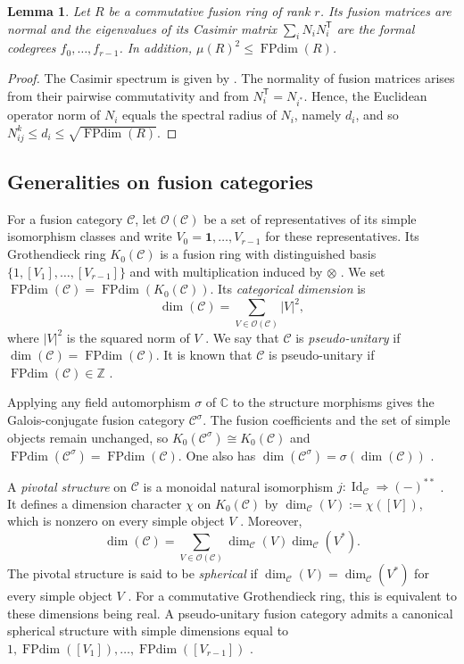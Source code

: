 \documentclass[11pt]{amsart}
\newtheorem{lemma}[theorem]{Lemma}
\theoremstyle{definition}
\DeclareMathOperator{\FPdim}{FPdim}
\newcommand{\C}{\mathbb C}
\newcommand{\Z}{\mathbb Z}
\newcommand{\one}{\mathbf1}
\numberwithin{equation}{section}
\begin{document}
\begin{lemma}\label{lem:commutative}
Let $R$ be a commutative fusion ring of rank $r$. Its fusion matrices are
normal and the eigenvalues of its \textnormal{Casimir matrix} $\sum_iN_iN_i^{\mathsf T}$ are the formal codegrees $f_0,\dots, f_{r-1}$.
In addition, $\mu(R)^2\leq\FPdim(R)$.
\end{lemma}
\begin{proof}
The Casimir spectrum is given by
\cite[Example~2.4 and Lemma~2.6]{OstrikCodegrees}.
The normality of fusion matrices arises from their pairwise commutativity and from $N_i^{\mathsf T}=N_{i^*}$. 
Hence, the Euclidean operator norm of $N_i$ equals the spectral radius of $N_i$, namely $d_i$, and so $N_{ij}^k\leq d_i\leq\sqrt{\FPdim(R)}$.
\end{proof}

\subsection{Generalities on fusion categories} \label{sub-sec2.2}
For a fusion category $\mathcal C$, let $\mathcal O(\mathcal C)$ be a
set of representatives of its simple isomorphism classes and write
$V_0=\one,\ldots,V_{r-1}$ for these representatives.
Its Grothendieck ring $K_0(\mathcal C)$ is a fusion ring with distinguished basis
$\{1, [V_1],\dots, [V_{r-1}]\}$ and with multiplication induced by $\otimes$
\cite[Proposition~4.9.1]{EGNO}. We set
$\FPdim(\mathcal C)=\FPdim(K_0(\mathcal C))$.
Its \textit{categorical dimension} is
\[
 \dim(\mathcal C)=\sum_{V\in\mathcal O(\mathcal C)}|V|^2,
\]
where $|V|^2$ is the squared norm of $V$ \cite[Definition~7.21.3]{EGNO}.
We say that $\mathcal{C}$ is \emph{pseudo-unitary} if
$\dim(\mathcal C)=\FPdim(\mathcal C)$.
It is known that $\mathcal{C}$ is pseudo-unitary if $\FPdim(\mathcal C)\in\Z$ \cite[Proposition~9.6.5]{EGNO}.

Applying any field automorphism $\sigma$ of $\C$ to the
structure morphisms gives the Galois-conjugate fusion category
$\mathcal C^\sigma$. The fusion coefficients and the set of simple objects remain
unchanged, so $K_0(\mathcal C^\sigma)\cong K_0(\mathcal C)$ and
$\FPdim(\mathcal C^\sigma)=\FPdim(\mathcal C)$.
One also has $\dim(\mathcal C^\sigma)=\sigma(\dim(\mathcal C))$
\cite[\S2.1]{OstrikGlobal}.

A \textit{pivotal structure} on $\mathcal C$ is a monoidal natural isomorphism
$j:\operatorname{Id}_{\mathcal C}\Rightarrow(-)^{**}$
\cite[Definition~4.7.7]{EGNO}. It defines a dimension character $\chi$ on $K_0(\mathcal{C})$ by $\dim_{\mathcal C}(V):=\chi([V])$, which is nonzero on every simple object $V$ \cite[Propositions~4.7.12 and~4.8.4]{EGNO}. 
Moreover, \[
 \dim(\mathcal C)=
 \sum_{V\in\mathcal O(\mathcal C)}
 \dim_{\mathcal C}(V)\dim_{\mathcal C}(V^*).
\]
The pivotal structure is said to be \textit{spherical} if $\dim_{\mathcal C}(V)=\dim_{\mathcal C}(V^*)$ for every simple object $V$
\cite[Definition~4.7.14]{EGNO}. 
For a commutative Grothendieck ring, this
is equivalent to these dimensions being real. 
A pseudo-unitary fusion category admits a canonical spherical structure
with simple dimensions equal to $1,\FPdim([V_1]), \dots, \FPdim([V_{r-1}])$ \cite[Proposition~9.5.1]{EGNO}.
\end{document}
